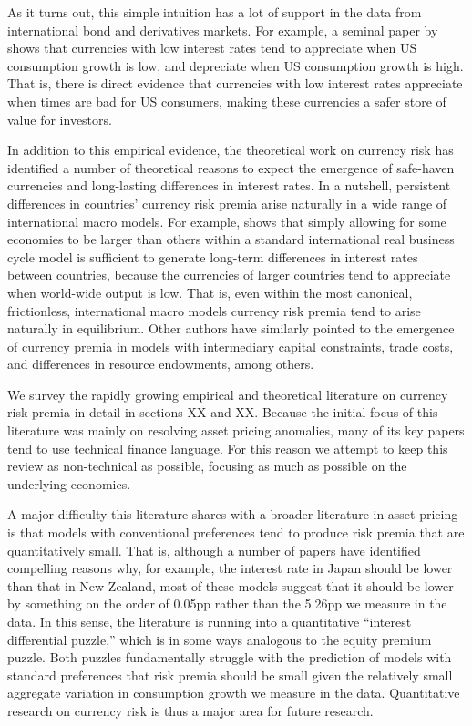 \documentclass{ar-1col}
\begin{document}
As it turns out, this simple intuition has a lot of support in the data from international bond and derivatives markets. For example, a seminal paper by \citet{LustigVerdelhan2007} shows that currencies with low interest rates tend to appreciate when US consumption growth is low, and depreciate when US consumption growth is high. That is, there is direct evidence that currencies with low interest rates appreciate when times are bad for US consumers, making these currencies a safer store of value for investors.

In addition to this empirical evidence, the theoretical work on currency risk has identified a number of theoretical reasons to expect the emergence of safe-haven currencies and long-lasting differences in interest rates. In a nutshell, persistent differences in countries' currency risk premia arise naturally in a wide range of international macro models. For example, \citet{Hassan2013} shows that simply allowing for some economies to be larger than others within a standard international real business cycle model is sufficient to generate long-term differences in interest rates between countries, because the currencies of larger countries tend to appreciate when world-wide output is low. That is, even within the most canonical, frictionless, international macro models currency risk premia tend to arise naturally in equilibrium. Other authors have similarly pointed to the emergence of currency premia in models with intermediary capital constraints, trade costs, and differences in resource endowments, among others.

We survey the rapidly growing empirical and theoretical literature on currency risk premia in detail in sections XX and XX. Because the initial focus of this literature was mainly on resolving asset pricing anomalies, many of its key papers tend to use technical finance language. For this reason we attempt to keep this review as non-technical as possible, focusing as much as possible on the underlying economics.

A major difficulty this literature shares with a broader literature in asset pricing is that models with conventional preferences tend to produce risk premia that are quantitatively small. That is, although a number of papers have identified compelling reasons why, for example, the interest rate in Japan should be lower than that in New Zealand, most of these models suggest that it should be lower by something on the order of 0.05pp rather than the 5.26pp we measure in the data. In this sense, the literature is running into a quantitative ``interest differential puzzle,'' which is in some ways analogous to the equity premium puzzle. Both puzzles fundamentally struggle with the prediction of models with standard preferences that risk premia should be small given the relatively small aggregate variation in consumption growth we measure in the data. Quantitative research on currency risk is thus a major area for future research.
\end{document}
